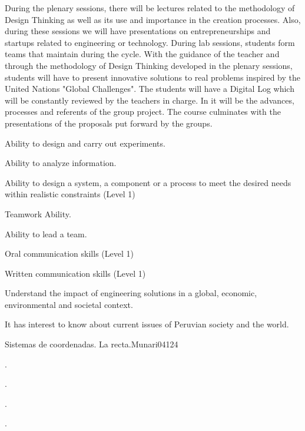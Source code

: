 \begin{syllabus}


\begin{justification}
During the plenary sessions, there will be lectures related to the methodology of Design Thinking as well as its use and importance in the creation processes. Also, during these sessions we will have presentations on entrepreneurships and startups related to engineering or technology.
During lab sessions, students form teams that maintain during the cycle. With the guidance of the teacher and through the methodology of Design Thinking developed in the plenary sessions, students will have to present innovative solutions to real problems inspired by the United Nations "Global Challenges".
The students will have a Digital Log which will be constantly reviewed by the teachers in charge. In it will be the advances, processes and referents of the group project. The course culminates with the presentations of the proposals put forward by the groups.
\end{justification}

\begin{goals}
\item Ability to design and carry out experiments.
\item Ability to analyze information.
\item Ability to design a system, a component or a process to meet the desired needs within realistic constraints (Level 1)
\item Teamwork Ability.
\item Ability to lead a team.
\item Oral communication skills (Level 1)
\item Written communication skills (Level 1)
\item Understand the impact of engineering solutions in a global, economic, environmental and societal context.
\item It has interest to know about current issues of Peruvian society and the world.
\end{goals}

\begin{outcomes}
\end{outcomes}

\begin{unit}{Sistemas de coordenadas. La recta.}{Munari04}{12}{4}
   \begin{topics}
      \item .
      \item .
      \item .
   \end{topics}
   \begin{unitgoals}
      \item .
   \end{unitgoals}
\end{unit}


\begin{coursebibliography}
\end{coursebibliography}

\end{syllabus}
